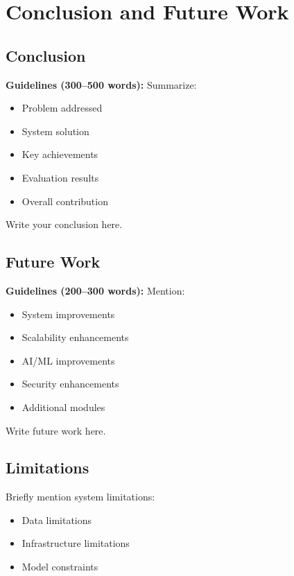 
\chapter{Conclusion and Future Work}


\section{Conclusion}

\textbf{Guidelines (300–500 words):}
Summarize:
\begin{itemize}
    \item Problem addressed
    \item System solution
    \item Key achievements
    \item Evaluation results
    \item Overall contribution
\end{itemize}

Write your conclusion here.


\section{Future Work}

\textbf{Guidelines (200–300 words):}
Mention:
\begin{itemize}
    \item System improvements
    \item Scalability enhancements
    \item AI/ML improvements
    \item Security enhancements
    \item Additional modules
\end{itemize}

Write future work here.


\section{Limitations}

Briefly mention system limitations:
\begin{itemize}
    \item Data limitations
    \item Infrastructure limitations
    \item Model constraints
\end{itemize}
